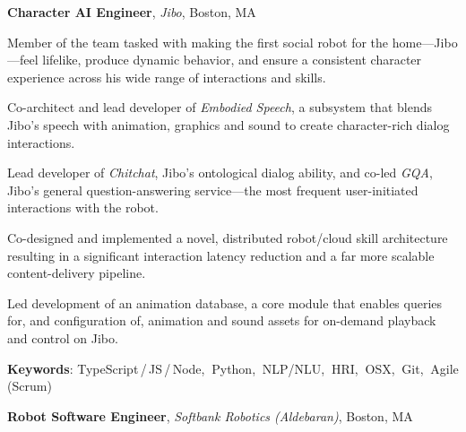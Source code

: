 \documentclass[10pt, letter]{article}
\newcommand{\years}[1]{\marginnote{\footnotesize #1}}
\newenvironment{desc*}{
  \begin{description}
    \setlength{\itemsep}{0.2pt}
    \setlength{\parskip}{-1pt}
    \setlength{\parsep}{0pt}
  }{
  \end{description}
}
\begin{document}
\years{2016 -- 2018} 
\textbf{\fontsize{10.5pt}{1em}\selectfont Character AI Engineer},
\textit{Jibo}, Boston, MA\bigskip

Member of the team tasked with making the first social robot for the home---Jibo---feel lifelike,
produce dynamic behavior, and ensure a consistent character experience across his wide range of
interactions and skills.
\begin{itemize}[leftmargin=*, parsep=0pt, rightmargin=1.5cm]
  {\light
\item Co-architect and lead developer of \textit{Embodied Speech}, a subsystem that blends Jibo's
  speech with animation, graphics and sound to create character-rich dialog interactions.
\item Lead developer of \textit{Chitchat}, Jibo's ontological dialog ability, and co-led
  \textit{GQA}, Jibo's general question-answering service---the most frequent user-initiated
  interactions with the robot.
\item Co-designed and implemented a novel, distributed robot/cloud skill architecture resulting in a
  significant interaction latency reduction and a far more scalable content-delivery pipeline.
\item Led development of an animation database, a core module that enables queries for, and
  configuration of, animation and sound assets for on-demand playback and control on Jibo.
  }
\end{itemize}
\vspace{-.2cm}
\begin{desc*}
\item[\rm \color{redblue} \textbf{Keywords}:] TypeScript\,/\,JS\,/\,Node,$\:$ Python,$\:$ NLP/NLU,$\:$ HRI,$\:$ OSX,$\:$ Git,$\:$ Agile (Scrum)\bigbreak
\end{desc*}

\years{2014 - 2016} 
\textbf{\fontsize{10.5pt}{1em}\selectfont Robot Software Engineer},
\textit{Softbank Robotics (Aldebaran)}, Boston, MA\bigskip
\end{document}
